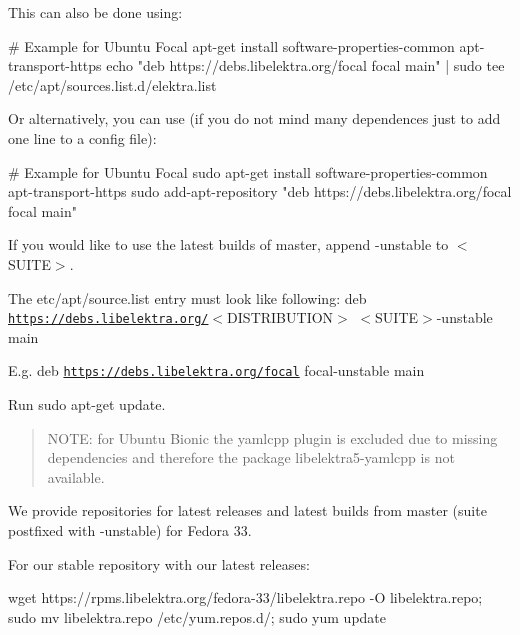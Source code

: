 This can also be done using\+:


\begin{DoxyCode}
# Example for Ubuntu Focal
apt-get install software-properties-common apt-transport-https
echo "deb https://debs.libelektra.org/focal focal main" | sudo tee /etc/apt/sources.list.d/elektra.list
\end{DoxyCode}


Or alternatively, you can use (if you do not mind many dependences just to add one line to a config file)\+:


\begin{DoxyCode}
# Example for Ubuntu Focal
sudo apt-get install software-properties-common apt-transport-https
sudo add-apt-repository "deb https://debs.libelektra.org/focal focal main"
\end{DoxyCode}


If you would like to use the latest builds of master, append {\ttfamily -\/unstable} to {\ttfamily $<$S\+U\+I\+TE$>$}.

The {\ttfamily etc/apt/source.\+list} entry must look like following\+: {\ttfamily deb \href{https://debs.libelektra.org/}{\tt https\+://debs.\+libelektra.\+org/}$<$D\+I\+S\+T\+R\+I\+B\+U\+T\+I\+ON$>$ $<$S\+U\+I\+TE$>$-\/unstable main}

E.\+g. {\ttfamily deb \href{https://debs.libelektra.org/focal}{\tt https\+://debs.\+libelektra.\+org/focal} focal-\/unstable main}


\begin{DoxyEnumerate}
\item Run {\ttfamily sudo apt-\/get update}.
\end{DoxyEnumerate}

\begin{quote}
N\+O\+TE\+: for Ubuntu Bionic the yamlcpp plugin is excluded due to missing dependencies and therefore the package {\ttfamily libelektra5-\/yamlcpp} is not available. \end{quote}


We provide repositories for latest releases and latest builds from master (suite postfixed with {\ttfamily -\/unstable}) for Fedora 33.

For our stable repository with our latest releases\+:


\begin{DoxyCode}
wget https://rpms.libelektra.org/fedora-33/libelektra.repo -O libelektra.repo;
sudo mv libelektra.repo /etc/yum.repos.d/;
sudo yum update
\end{DoxyCode}


